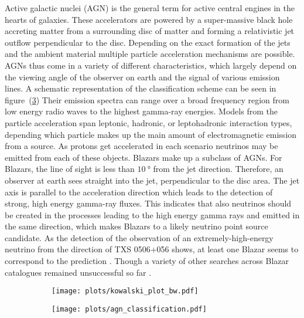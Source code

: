 Active galactic nuclei (AGN) is the general term for active central engines in the hearts of galaxies.
These accelerators are powered by a super-massive black hole accreting matter from a surrounding disc of matter and forming a relativistic jet outflow perpendicular to the disc.
Depending on the exact formation of the jets and the ambient material multiple particle acceleration mechanisms are possible.
AGNs thus come in a variety of different characteristics, which largely depend on the viewing angle of the observer on earth and the signal of various emission lines.
A schematic representation of the classification scheme can be seen in figure~(\ref{fig:astro_agns})
Their emission spectra can range over a broad frequency region from low energy radio waves to the highest gamma-ray energies.
Models from the particle acceleration span leptonic, hadronic, or leptohadronic interaction types, depending which particle makes up the main amount of electromagnetic emission from a source.
As protons get accelerated in each scenario neutrinos may be emitted from each of these objects.
Blazars make up a subclass of AGNs.
For Blazars, the line of sight is less than $\SI{10}{\degree}$ from the jet direction.
Therefore, an observer at earth sees straight into the jet, perpendicular to the disc area.
The jet axis is parallel to the acceleration direction which leads to the detection of strong, high energy gamma-ray fluxes.
This indicates that also neutrinos should be created in the processes leading to the high energy gamma rays and emitted in the same direction, which makes Blazars to a likely neutrino point source candidate.
As the detection of the observation of an extremely-high-energy neutrino from the direction of TXS 0506+056 shows, at least one Blazar seems to correspond to the prediction .
Though a variety of other searches across Blazar catalogues remained unsuccessful so far .


\begin{figure}[htbp]
  \centering
  \begin{subfigure}[t]{0.49\textwidth}
    \centering
    \texttt{[image: plots/kowalski\_plot\_bw.pdf]}
    \label{fig:astro_kowalski_plot}
  \end{subfigure}
  \hfill
  \begin{subfigure}[t]{0.49\textwidth}
    \centering
    \texttt{[image: plots/agn\_classification.pdf]}
    \label{fig:astro_agns}
  \end{subfigure}
\end{figure}



